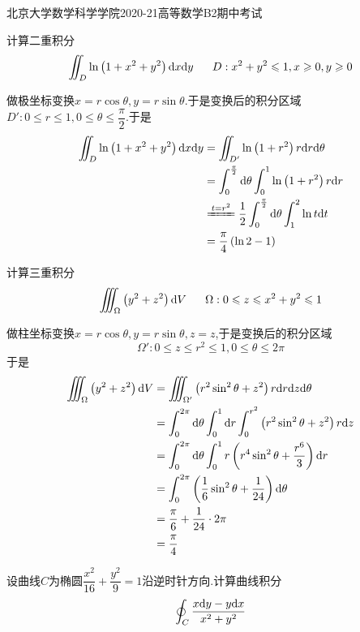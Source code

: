 \documentclass{ctexart}
\begin{document}
\pagestyle{empty}
\begin{center}\Large
    北京大学数学科学学院2020-21高等数学B2期中考试
\end{center}
\begin{problem}[1.(10\songti{分})]
    计算二重积分
    \[\iint_{D}\ln\left(1+x^2+y^2\right)\dx\di y\ \ \ \ \ D:x^2+y^2\leqslant1,x\geqslant0,y\geqslant0\]
\end{problem}
\begin{solution}
    做极坐标变换$x=r\cos\theta,y=r\sin\theta$.于是变换后的积分区域$D':0\leqslant r\leqslant 1,0\leqslant\theta\leqslant\dfrac\pi2$.于是
    \[\begin{aligned}
        \iint_{D}\ln\left(1+x^2+y^2\right)\dx\di y
        &= \iint_{D'}\ln\left(1+r^2\right)r\di r\di\theta \\
        &= \int_0^{\frac\pi2}\di\theta\int_0^1\ln\left(1+r^2\right)r\di r \\
        &\xlongequal{t=r^2} \dfrac12\int_0^{\frac\pi2}\di\theta\int_1^2\ln t\di t \\
        &= \dfrac\pi4\left(\ln 2-1\right)
    \end{aligned}\]
\end{solution}
\begin{problem}[2.(10\songti{分})]
    计算三重积分
    \[\iiint_{\Omega}\left(y^2+z^2\right)\di V\ \ \ \ \ \Omega:0\leqslant z\leqslant x^2+y^2\leqslant1\]
\end{problem}
\begin{solution}
    做柱坐标变换$x=r\cos\theta,y=r\sin\theta,z=z$,于是变换后的积分区域
    \[\Omega':0\leqslant z\leqslant r^2\leqslant 1,0\leqslant \theta\leqslant 2\pi\]
    于是
    \[\begin{aligned}
        \iiint_{\Omega}\left(y^2+z^2\right)\mathrm{d} V
        &= \iiint_{\Omega'}\left(r^2\sin^2\theta+z^2\right)r\mathrm{d} r\mathrm{d} z\mathrm{d}\theta \\
        &= \int_0^{2\pi}\mathrm{d}\theta\int_0^1\mathrm{d} r\int_0^{r^2}\left(r^2\sin^2\theta+z^2\right)r\mathrm{d} z \\
        &= \int_0^{2\pi}\mathrm{d}\theta\int_0^1r\left(r^4\sin^2\theta+\dfrac{r^6}{3}\right)\mathrm{d} r\\
        &= \int_0^{2\pi}\left(\dfrac16\sin^2\theta+\dfrac1{24}\right)\mathrm{d}\theta\\
        &= \dfrac\pi6+\dfrac1{24}\cdot2\pi \\
        &= \dfrac\pi4
    \end{aligned}\]
\end{solution}
\begin{problem}[3.(10\songti{分})]
    设曲线$C$为椭圆$\dfrac{x^2}{16}+\dfrac{y^2}{9}=1$沿逆时针方向.计算曲线积分
    \[\oint_{C}\dfrac{x\mathrm{d} y-y\mathrm{d} x}{x^2+y^2}\]
\end{problem}
\end{document}
